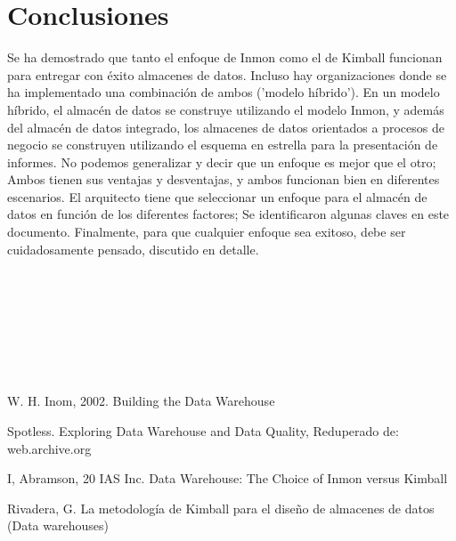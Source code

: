 \documentclass[twoside,twocolumn]{article}
\begin{document}
\section{Conclusiones}
\begin{itemize}	
 Se ha demostrado que tanto el enfoque de Inmon como el de Kimball funcionan para entregar con éxito almacenes de datos. Incluso hay organizaciones donde se ha implementado una combinación de ambos ('modelo híbrido'). En un modelo híbrido, el almacén de datos se construye utilizando el modelo Inmon, y además del almacén de datos integrado, los almacenes de datos orientados a procesos de negocio se construyen utilizando el esquema en estrella para la presentación de informes. No podemos generalizar y decir que un enfoque es mejor que el otro; Ambos tienen sus ventajas y desventajas, y ambos funcionan bien en diferentes escenarios. El arquitecto tiene que seleccionar un enfoque para el almacén de datos en función de los diferentes factores; Se identificaron algunas claves en este documento. Finalmente, para que cualquier enfoque sea exitoso, debe ser cuidadosamente pensado, discutido en detalle. \\\\\\\\\\\\\\\

\end{itemize} 

\newpage



\begin{thebibliography}{99} 

\bibitem[1]{}
\newblock W. H. Inom, 2002. Building the Data Warehouse

\bibitem[2]{}
\newblock Spotless. Exploring Data Warehouse and Data Quality, Reduperado de: web.archive.org

\bibitem[3]{}
\newblock I, Abramson, 20 IAS Inc. Data Warehouse: The Choice of Inmon versus Kimball

\bibitem[4]{}
\newblock Rivadera, G. La metodología de Kimball para el diseño de almacenes de
datos (Data warehouses) 

\end{thebibliography}


\end{document}
